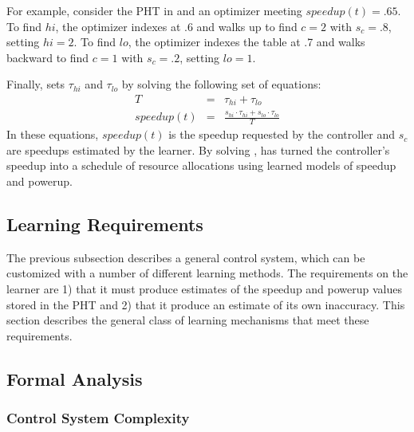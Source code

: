 For example, consider the PHT in  and an optimizer
meeting $speedup(t) = .65$.  To find $hi$, the optimizer indexes at .6
and walks up to find $c=2$ with $s_c=.8$, setting $hi = 2$.  To find
$lo$, the optimizer indexes the table at .7 and walks backward to find
$c=1$ with $s_c=.2$, setting $lo = 1$.

Finally, \SYSTEM{} sets $\tau_{hi}$ and $\tau_{lo}$ by solving the
following set of equations:
\begin{eqnarray}
  T &=& \tau_{hi} + \tau_{lo}    \label{eqn:s1} \\
  speedup(t) &=& \frac{s_{hi} \cdot \tau_{hi} + s_{lo} \cdot \tau_{lo}}{T} \label{eqn:s2}
\end{eqnarray}
In these equations, $speedup(t)$ is the speedup requested by the
controller and $s_c$ are speedups estimated by the learner.  By
solving , \SYSTEM{} has turned the controller's
speedup into a schedule of resource allocations using learned models
of speedup and powerup.

\subsection{\SYSTEM{} Learning Requirements}
The previous subsection describes a general control system, which can
be customized with a number of different learning methods.  The
requirements on the learner are 1) that it must produce estimates of
the speedup and powerup values stored in the PHT and 2) that it
produce an estimate of its own inaccuracy.  This section describes the
general class of learning mechanisms that meet these requirements.



\subsection{Formal Analysis}
\subsubsection{Control System Complexity}

